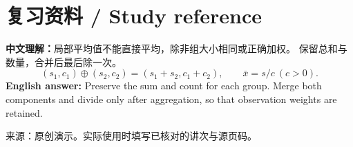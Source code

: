\documentclass[11pt,a4paper]{article}
\begin{document}
\section*{复习资料 / Study reference}
\textbf{中文理解：}局部平均值不能直接平均，除非组大小相同或正确加权。
保留总和与数量，合并后最后除一次。
\[
(s_1,c_1)\oplus(s_2,c_2)=(s_1+s_2,c_1+c_2),\qquad \bar{x}=s/c\ (c>0).
\]
\textbf{English answer:} Preserve the sum and count for each group. Merge both
components and divide only after aggregation, so that observation weights are retained.

\small 来源：原创演示。实际使用时填写已核对的讲次与源页码。
\end{document}
